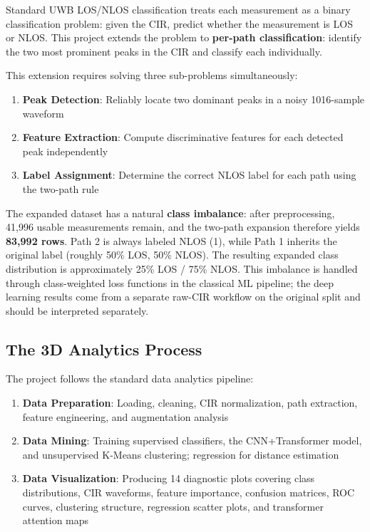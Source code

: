 \documentclass[12pt,a4paper]{article}
\providecommand{\tightlist}{%
  \setlength{\itemsep}{0pt}\setlength{\parskip}{0pt}}
\begin{document}
Standard UWB LOS/NLOS classification treats each measurement as a binary
classification problem: given the CIR, predict whether the measurement
is LOS or NLOS. This project extends the problem to \textbf{per-path
classification}: identify the two most prominent peaks in the CIR and
classify each individually.

This extension requires solving three sub-problems simultaneously:

\begin{enumerate}
\def\labelenumi{\arabic{enumi}.}
\tightlist
\item
  \textbf{Peak Detection}: Reliably locate two dominant peaks in a noisy
  1016-sample waveform
\item
  \textbf{Feature Extraction}: Compute discriminative features for each
  detected peak independently
\item
  \textbf{Label Assignment}: Determine the correct NLOS label for each
  path using the two-path rule
\end{enumerate}

The expanded dataset has a natural \textbf{class imbalance}: after
preprocessing, 41,996 usable measurements remain, and the two-path
expansion therefore yields \textbf{83,992 rows}. Path 2 is always
labeled NLOS (1), while Path 1 inherits the original label (roughly 50\%
LOS, 50\% NLOS). The resulting expanded class distribution is
approximately 25\% LOS / 75\% NLOS. This imbalance is handled through
class-weighted loss functions in the classical ML pipeline; the deep
learning results come from a separate raw-CIR workflow on the original
split and should be interpreted separately.

\subsection{The 3D Analytics Process}\label{the-3d-analytics-process}

The project follows the standard data analytics pipeline:

\begin{enumerate}
\def\labelenumi{\arabic{enumi}.}
\tightlist
\item
  \textbf{Data Preparation}: Loading, cleaning, CIR normalization, path
  extraction, feature engineering, and augmentation analysis
\item
  \textbf{Data Mining}: Training supervised classifiers, the
  CNN+Transformer model, and unsupervised K-Means clustering; regression
  for distance estimation
\item
  \textbf{Data Visualization}: Producing 14 diagnostic plots covering
  class distributions, CIR waveforms, feature importance, confusion
  matrices, ROC curves, clustering structure, regression scatter plots,
  and transformer attention maps
\end{enumerate}
\end{document}
